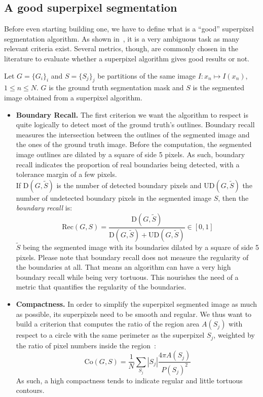 \documentclass{article}
\begin{document}
    \subsection{A good superpixel segmentation}
        \label{par:metrics}
        Before even starting building one, we have to define what is a ``good'' superpixel segmentation algorithm. As shown in~\cite{stutz2017}, it is a very ambiguous task as many relevant criteria exist. Several metrics, though, are commonly chosen in the literature to evaluate whether a superpixel algorithm gives good results or not.

        Let $G = \{G_i\}_i$ and $S = \{S_j\}_j$ be partitions of the same image $I : x_n \mapsto I(x_n)$, $1 \leq n \leq N$. $G$ is the ground truth segmentation mask and $S$ is the segmented image obtained from a superpixel algorithm.
        \begin{itemize}
            \item \textbf{Boundary Recall.} The first criterion we want the algorithm to respect is quite logically to detect most of the ground truth's outlines. Boundary recall measures the intersection between the outlines of the segmented image and the ones of the ground truth image. Before the computation, the segmented image outlines are dilated by a square of side 5 pixels. As such, boundary recall indicates the proportion of real boundaries being detected, with a tolerance margin of a few pixels.\\
            If $\text{D}(G,\tilde{S})$ is the number of detected boundary pixels and $\text{UD}(G,\tilde{S})$ the number of undetected boundary pixels in the segmented image $S$, then the \textit{boundary recall} is:
            $$
            \mathrm{Rec}(G,S)=\frac{\mathrm{D}(G,\tilde{S})}{\mathrm{D}(G,\tilde{S})+\mathrm{UD}(G,\tilde{S})} \in [0,1]
            $$
            $\tilde{S}$ being the segmented image with its boundaries dilated by a square of side 5 pixels. Please note that boundary recall does not measure the regularity of the boundaries at all. That means an algorithm can have a very high boundary recall while being very tortuous. This nourishes the need of a metric that quantifies the regularity of the boundaries.

            \item \textbf{Compactness.} In order to simplify the superpixel segmented image as much as possible, its superpixels need to be smooth and regular. We thus want to build a criterion that computes the ratio of the region area $A(S_j)$ with respect to a circle with the same perimeter as the superpixel $S_j$, weighted by the ratio of pixel numbers inside the region~\cite{schick2012}:
            $$
            \mathrm{Co}(G, S)=\frac{1}{N} \sum_{S_j}|S_j| \frac{4 \pi A(S_j)}{P(S_j)^2}
            $$
            As such, a high compactness tends to indicate regular and little tortuous contours.


\end{itemize}
\end{document}
